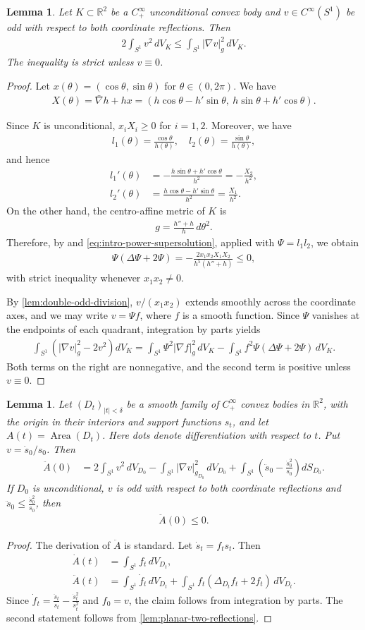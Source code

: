 \documentclass[12pt]{amsart}
\newcommand{\R}{\mathbb{R}}
\newcommand{\abs}[1]{\left|#1\right|}
\newcommand{\eq}[1]{\begin{equation}\begin{alignedat}{2}#1\end{alignedat}\end{equation}}
\theoremstyle{plain}
\newtheorem{lemma}[theorem]{Lemma}
\theoremstyle{definition}
\theoremstyle{remark}
\numberwithin{equation}{section}
\begin{document}
\begin{lemma}\label{lem:planar-two-reflections}
Let $K\subset\R^2$ be a $C^{\infty}_+$ unconditional convex body and $v\in C^{\infty}(S^1)$ be odd with respect to both coordinate reflections. Then
\eq{
 2\int_{S^1}v^2\,dV_K\leq \int_{S^1}\abs{\nabla v}_{g}^2\,dV_K.
}
The inequality is strict unless $v\equiv 0$.
\end{lemma}

\begin{proof}
Let $x(\theta)=(\cos\theta,\sin\theta)$ for $\theta\in(0,2\pi)$. We have
\eq{
X(\theta)=\bar{\nabla} h+hx=(h\cos\theta-h'\sin\theta,\ h\sin\theta+h'\cos\theta).
}

Since $K$ is unconditional, $x_iX_i\geq 0$ for $i=1,2$. Moreover, we have
\eq{
l_1(\theta)=\frac{\cos\theta}{h(\theta)},\quad
l_2(\theta)=\frac{\sin\theta}{h(\theta)},
}
and hence
\eq{
l_1'(\theta)&=-\frac{h\sin\theta+h'\cos\theta}{h^2}=-\frac{X_2}{h^2},\\
l_2'(\theta)&=\frac{h\cos\theta-h'\sin\theta}{h^2}=\frac{X_1}{h^2}.
}
On the other hand, the centro-affine metric of $K$ is
\eq{
g=\frac{h''+h}{h}\,d\theta^2.
}
Therefore, by \cite[Lem. 2.3]{HI26} and \eqref{eq:intro-power-supersolution}, applied with $\Psi=l_1l_2$, we obtain
\eq{
 \Psi(\Delta\Psi+2\Psi)
 =-\frac{2x_1x_2X_1X_2}{h^5(h''+h)}\leq 0,
}
with strict inequality whenever $x_1x_2\neq0$.

By \autoref{lem:double-odd-division}, $v/(x_1x_2)$ extends smoothly across the coordinate axes, and we may write $v=\Psi f$, where $f$ is a smooth function. Since $\Psi$ vanishes at the endpoints of each quadrant, integration by parts yields
\eq{
 \int_{S^1}\left(|\nabla v|_{g}^2-2v^2\right)dV_K
 =\int_{S^1} \Psi^2|\nabla f|_{g}^2\,dV_K
 -\int_{S^1} f^2\Psi (\Delta\Psi+2\Psi)\,dV_K.
}
Both terms on the right are nonnegative, and the second term is positive unless $v\equiv 0$.
\end{proof}


\begin{lemma}\label{lem:area-second-variation}
Let $(D_t)_{|t|<\delta}$ be a smooth family of $C^{\infty}_+$ convex bodies in $\R^2$, with the origin in their interiors and support functions $s_t$, and let $A(t)=\operatorname{Area}(D_t)$. Here dots denote differentiation with respect to $t$. Put $v=\dot{s}_0/s_0$. Then
\eq{
 \ddot{A}(0)
 &=2\int_{S^1}v^2\,dV_{D_0}
 -\int_{S^1}|\nabla v|_{g_{D_0}}^2\,dV_{D_0}+\int_{S^1}\left(\ddot{s}_0
 -\frac{\dot{s}_0^2}{s_0}\right)dS_{D_0}.
}
If $D_0$ is unconditional, $v$ is odd with respect to both coordinate reflections and $\ddot{s}_0\leq \frac{\dot{s}_0^2}{s_0}$, then
\eq{
 \ddot{A}(0)\leq 0.
 }
\end{lemma}
\begin{proof}
The derivation of $\ddot{A}$ is standard. Let $\dot{s}_t=f_ts_t$. Then
\eq{
\dot{A}(t)&=\int_{S^1}f_t\,dV_{D_t},\\
\ddot{A}(t)&=\int_{S^1}\dot{f}_t\,dV_{D_t}
+\int_{S^1}f_t(\Delta_{D_t}f_t+2f_t)\,dV_{D_t}.
}
Since $\dot{f}_t=\frac{\ddot{s}_t}{s_t}-\frac{\dot{s}_t^2}{s_t^2}$ and $f_0=v$, the claim follows from integration by parts. The second statement follows from \autoref{lem:planar-two-reflections}.
\end{proof}
\end{document}
